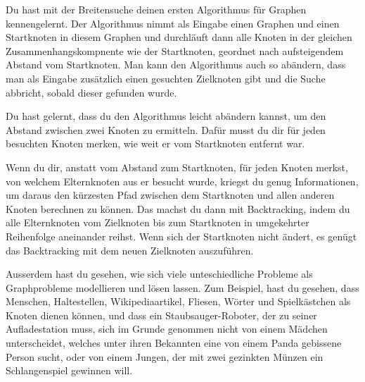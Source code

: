 Du hast mit der Breitensuche deinen ersten Algorithmus für Graphen kennengelernt. Der Algorithmus nimmt als Eingabe einen Graphen und einen Startknoten in diesem Graphen und durchläuft dann alle Knoten in der gleichen Zusammenhangskompnente wie der Startknoten, geordnet nach aufsteigendem Abstand vom Startknoten. Man kann den Algorithmus auch so abändern, dass man als Eingabe zusätzlich einen gesuchten Zielknoten gibt und die Suche abbricht, sobald dieser gefunden wurde.

Du hast gelernt, dass du den Algorithmus leicht abändern kannst, um den Abstand zwischen zwei Knoten zu ermitteln. Dafür musst du dir für jeden besuchten Knoten merken, wie weit er vom Startknoten entfernt war.

Wenn du dir, anstatt vom Abstand zum Startknoten, für jeden Knoten merkst, von welchem Elternknoten aus er besucht wurde, kriegst du genug Informationen, um daraus den kürzesten Pfad zwischen dem Startknoten und allen anderen Knoten berechnen zu können. Das machst du dann mit Backtracking, indem du alle Elternknoten vom Zielknoten bis zum Startknoten in umgekehrter Reihenfolge aneinander reihst. Wenn sich der Startknoten nicht ändert, es genügt das Backtracking mit dem neuen Zielknoten auszuführen.

Ausserdem hast du gesehen, wie sich viele unteschiedliche Probleme als Graphprobleme modellieren und lösen lassen. Zum Beispiel, hast du gesehen, dass Menschen, Haltestellen, Wikipediaartikel, Fliesen, Wörter und Spielkästchen als Knoten dienen können, und dass ein Staubsauger-Roboter, der zu seiner Aufladestation muss, sich im Grunde genommen nicht von einem Mädchen unterscheidet, welches unter ihren Bekannten eine von einem Panda gebissene Person sucht, oder von einem Jungen, der mit zwei gezinkten Münzen ein Schlangenspiel gewinnen will.